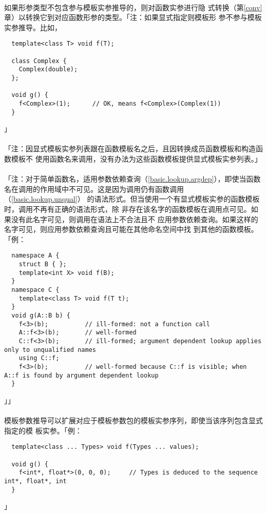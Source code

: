 \paragraph{}
如果形参类型不包含参与模板实参推导的，则对函数实参进行隐
式转换（第\ref{conv}章）以转换它到对应函数形参的类型。「注：如果显式指定则模板形
参不参与模板实参推导。比如，
\begin{lstlisting}
  template<class T> void f(T);

  class Complex {
    Complex(double);
  };

  void g() {
    f<Complex>(1);      // OK, means f<Complex>(Complex(1))
  }
\end{lstlisting}」

\paragraph{}
「注：因显式模板实参列表跟在函数模板名之后，且因转换成员函数模板和构造函数模板不
使用函数名来调用，没有办法为这些函数模板提供显式模板实参列表。」

\paragraph{}
「注：对于简单函数名，适用参数依赖查询（\ref{basic.lookup.argdep}），即使当函数
名在调用的作用域中不可见。这是因为调用仍有函数调用（\ref{basic.lookup.unqual}）
的语法形式。但当使用一个有显式模板实参的函数模板时，调用不再有正确的语法形式，除
非存在该名字的函数模板在调用点可见。如果没有此名字可见，则调用在语法上不合法且不
应用参数依赖查询。如果这样的名字可见，则应用参数依赖查询且可能在其他命名空间中找
到其他的函数模板。「例：
\begin{lstlisting}
  namespace A {
    struct B { };
    template<int X> void f(B);
  }
  namespace C {
    template<class T> void f(T t);
  }
  void g(A::B b) {
    f<3>(b);          // ill-formed: not a function call
    A::f<3>(b);       // well-formed
    C::f<3>(b);       // ill-formed; argument dependent lookup applies only to unqualified names
    using C::f;
    f<3>(b);          // well-formed because C::f is visible; when A::f is found by argument dependent lookup
  }
\end{lstlisting}」」

\paragraph{}
模板参数推导可以扩展对应于模板参数包的模板实参序列，即使当该序列包含显式指定的模
板实参。「例：
\begin{lstlisting}
  template<class ... Types> void f(Types ... values);

  void g() {
    f<int*, float*>(0, 0, 0);     // Types is deduced to the sequence int*, float*, int
  }
\end{lstlisting}」

